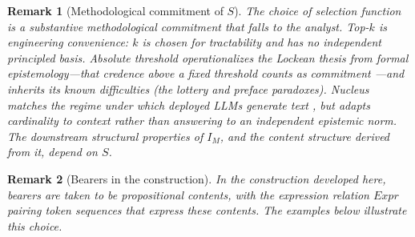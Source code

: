 \documentclass[11pt]{article}
\newtheorem{remark}{Remark}
\begin{document}
\begin{remark}[Methodological commitment of $S$]
\label{rem:methodological}
The choice of selection function is a substantive methodological commitment that falls to the analyst. Top-$k$ is engineering convenience: $k$ is chosen for tractability and has no independent principled basis. Absolute threshold operationalizes the Lockean thesis from formal epistemology---that credence above a fixed threshold counts as commitment \cite{foley1992}---and inherits its known difficulties (the lottery and preface paradoxes). Nucleus matches the regime under which deployed LLMs generate text \cite{holtzman2019}, but adapts cardinality to context rather than answering to an independent epistemic norm. The downstream structural properties of $I_M$, and the content structure derived from it, depend on $S$.
\end{remark}

\begin{remark}[Bearers in the construction]
\label{rem:bearersassentences}
In the construction developed here, bearers are taken to be propositional contents, with the expression relation $\mathit{Expr}$ pairing token sequences that express these contents. The examples below illustrate this choice.
\end{remark}
\end{document}
